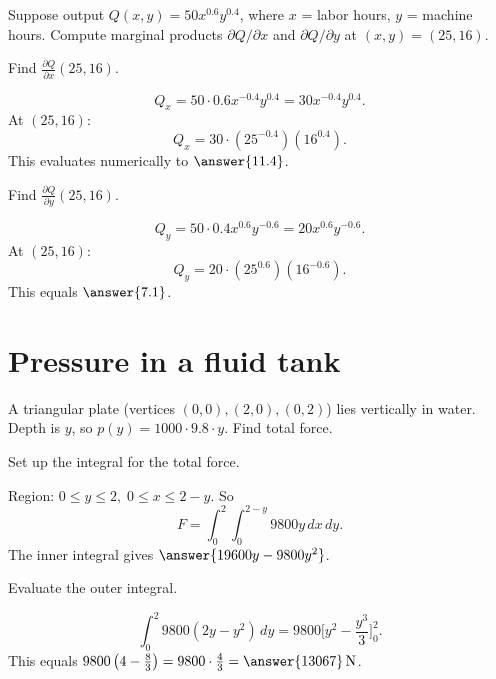\documentclass{ximera}
\begin{document}
Suppose output $Q(x,y)=50x^{0.6}y^{0.4}$, where $x$ = labor hours, $y$ = machine hours. 
Compute marginal products $\partial Q/\partial x$ and $\partial Q/\partial y$ at $(x,y)=(25,16)$.

\begin{problem}
Find $\frac{\partial Q}{\partial x}(25,16)$.

\begin{solution}
\[
Q_x = 50\cdot 0.6 x^{-0.4}y^{0.4} = 30x^{-0.4}y^{0.4}.
\]
At $(25,16)$: 
\[
Q_x = 30 \cdot (25^{-0.4})(16^{0.4}).
\]
This evaluates numerically to $\answer{11.4}$.
\end{solution}
\end{problem}

\begin{problem}
Find $\frac{\partial Q}{\partial y}(25,16)$.

\begin{solution}
\[
Q_y = 50\cdot 0.4 x^{0.6}y^{-0.6} = 20x^{0.6}y^{-0.6}.
\]
At $(25,16)$:
\[
Q_y = 20 \cdot (25^{0.6})(16^{-0.6}).
\]
This equals $\answer{7.1}$.
\end{solution}
\end{problem}

\section{Pressure in a fluid tank}

A triangular plate (vertices $(0,0),(2,0),(0,2)$) lies vertically in water. Depth is $y$, so $p(y)=1000\cdot 9.8\cdot y$. Find total force.

\begin{problem}
Set up the integral for the total force.

\begin{solution}
Region: $0\leq y\leq 2,\; 0\leq x\leq 2-y$. So
\[
F=\int_0^2\int_0^{2-y} 9800y\,dx\,dy.
\]
The inner integral gives $\answer{19600y-9800y^2}$.
\end{solution}
\end{problem}

\begin{problem}
Evaluate the outer integral.

\begin{solution}
\[
\int_0^2 9800(2y-y^2)\,dy=9800\Big[y^2 - \frac{y^3}{3}\Big]_0^2.
\]
This equals $9800\left(4-\frac{8}{3}\right) = 9800 \cdot \frac{4}{3} = \answer{13067}\,\text{N}$.
\end{solution}
\end{problem}
\end{document}
